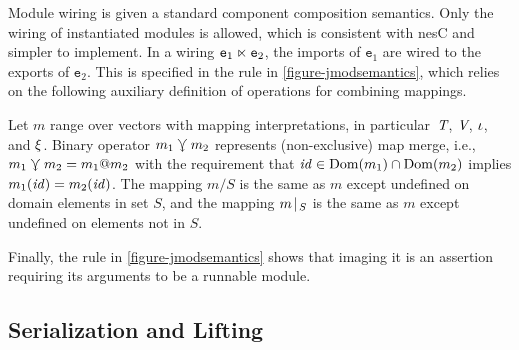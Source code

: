 Module wiring is given a standard component composition semantics. Only the wiring of
instantiated modules is allowed, which is consistent with nesC and simpler to implement. In a
wiring $\texttt{e}_1 \ltimes \texttt{e}_2$, the imports of $\texttt{e}_1$ are wired to the
exports of $\texttt{e}_2$. This is specified in the  rule in
\autoref{figure-jmodsemantics}, which relies on the following auxiliary definition of operations
for combining mappings.
\begin{definition}
  Let $m$ range over vectors with mapping interpretations, in particular~$\textit{T}$, $\textit{V}$,
  $\iota$, and $\xi$. Binary operator $m_1\curlyveedownarrow m_2$ represents (non-exclusive)
  map merge, i.e., $m_1 \curlyveedownarrow m_2 = m_1 @ m_2$ with the requirement that
  $\mathit{id}\in {\rm Dom}(m_1)\cap{\rm Dom}(m_2)$ implies $m_1(\mathit{id}) = m_2(\mathit{id})$. The
  mapping $m / S$ is the same as $m$ except undefined on domain elements in set $S$, and the
  mapping $m\!\mid\!_{S}$ is the same as $m$ except undefined on elements not in ${S}$.
\end{definition}
Finally, the  rule in \autoref{figure-jmodsemantics} shows that imaging it is
an assertion requiring its arguments to be a runnable module.

\subsection{Serialization and Lifting}
\label{section-serialization}

